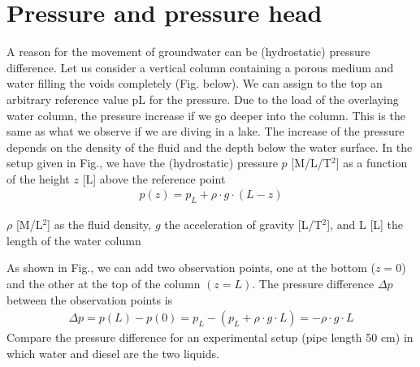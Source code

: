 \documentclass[letterpaper,10pt,english]{jupyterBook}
\let\sphinxpxdimen\pdfpxdimen\else\newdimen\sphinxpxdimen
\begin{document}
\section{Pressure and pressure head}
\label{\detokenize{content/flow/L3/13_gw_storage:pressure-and-pressure-head}}
\sphinxAtStartPar
A reason for the movement of groundwater can be (hydrostatic) pressure difference. Let us consider a vertical column containing a porous medium and water filling the voids completely (Fig. below). We can assign to the top an arbitrary reference value pL for the pressure.  Due to the load of the overlaying water column, the pressure increase if we go deeper into the column. This is the same as what we observe if we are diving in a lake. The increase of the pressure depends on the density of the fluid and the depth below the water surface. In the setup given in Fig., we have the (hydrostatic) pressure \(p\) {[}M/L/T\(^2\){]} as a function of the height \(z\) {[}L{]} above the reference point
\begin{equation*}
\begin{split}
p(z) = p_L + \rho \cdot g \cdot (L - z)
\end{split}
\end{equation*}
\begin{sphinxShadowBox}

\sphinxAtStartPar
\(\rho\) {[}M/L\(^2\){]} as the fluid density, 
\(g\) the acceleration of gravity {[}L/T\(^2\){]}, and  
L {[}L{]} the length of the water column
\end{sphinxShadowBox}

\noindent{\hspace*{\fill}\sphinxincludegraphics[width=600\sphinxpxdimen]{{L03_f_11}.png}\hspace*{\fill}}

\sphinxAtStartPar
As shown in Fig., we can add two observation points, one at the bottom (\(z = 0\)) and the other at the top of the column \((z=L)\). The pressure difference \(\Delta p\) between the observation points is
\begin{equation*}
\begin{split}
\Delta p = p(L) - p(0) = p_L - (p_L + \rho\cdot g \cdot L) = - \rho\cdot g \cdot L
\end{split}
\end{equation*}
\sphinxAtStartPar
{} Compare the pressure difference for an experimental setup (pipe length 50 cm) in which water and diesel are the two liquids.
\end{document}
